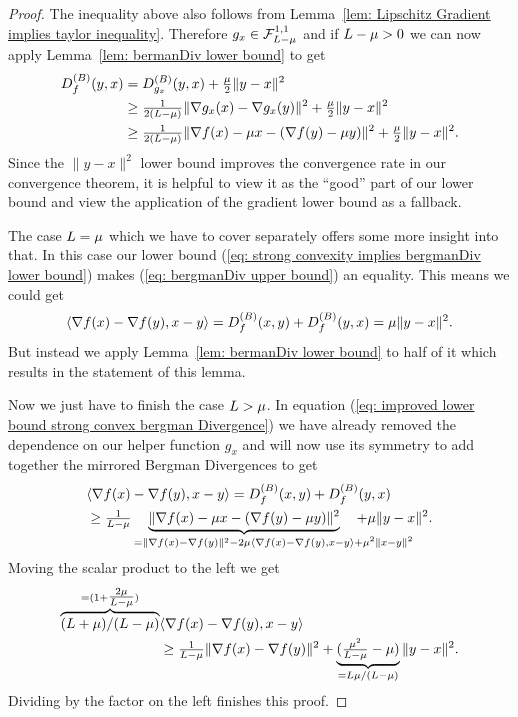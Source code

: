 \begin{proof}
	The inequality above also follows from Lemma~\ref{lem: Lipschitz Gradient
	implies taylor inequality}. Therefore
	\(g_x\in\mathcal{F}^{1,1}_{L-\mu}\) and if \(L -\mu>0\) we
	can now apply Lemma~\ref{lem: bermanDiv lower bound} to get
	\begin{align}
		D^{(B)}_{f}(y,x)
		&= D^{(B)}_{g_x}(y,x) + \tfrac{\mu}2 \|y-x\|^2
		\nonumber \\
		&\ge \tfrac{1}{2(L-\mu)} \|\nabla g_x(x) - \nabla g_x(y)\|^2
		+ \tfrac{\mu}2 \|y-x\|^2 
		\nonumber \\
		\label{eq: improved lower bound strong convex bergman Divergence}
		&\ge \tfrac{1}{2(L-\mu)}
		\|\nabla f(x) - \mu x - (\nabla f(y)-\mu y)\|^2
		+ \tfrac{\mu}2 \|y-x\|^2.
	\end{align}
	Since the \(\|y-x\|^2\) lower bound improves the convergence rate in
	our convergence theorem, it is helpful to view it as the ``good'' part of
	our lower bound and view the application of the gradient lower bound as
	a fallback.

	The case \(L=\mu\) which we have to cover separately offers some
	more insight into that. In this case our lower bound  (\ref{eq:
	strong convexity implies bergmanDiv lower bound}) makes (\ref{eq: bergmanDiv
	upper bound}) an equality. This means we could get
	\begin{align*}
		\langle \nabla f(x) - \nabla f(y), x-y\rangle
		= D^{(B)}_{f}(x,y) + D^{(B)}_{f}(y,x) = \mu \|y-x\|^2.
	\end{align*}
	But instead we apply Lemma~\ref{lem: bermanDiv lower bound} to half of it
	which results in the statement of this lemma.

	Now we just have to finish the case \(L>\mu\). In equation
	(\ref{eq: improved lower bound strong convex bergman Divergence}) we have
	already removed the dependence on our helper function \(g_x\) and will now
	use its symmetry to add together the mirrored Bergman Divergences to get
	\begin{align*}
		&\langle \nabla f(x) - \nabla f(y), x-y\rangle
		= \bergmanDiv{f}(x,y) + \bergmanDiv{f}(y,x) \\
		&\ge \tfrac{1}{\ubound-\lbound}
		\underbrace{\|\nabla f(x) - \lbound x - (\nabla f(y)-\lbound y)\|^2}_{
			=\|\nabla f(x) - \nabla f(y)\|^2
			- 2\lbound \langle \nabla f(x) - \nabla f(y), x-y\rangle
			\mathrlap{+ \lbound^2 \| x-y\|^2}
		}
		+ \lbound \|y-x\|^2.
	\end{align*}
	Moving the scalar product to the left we get
	\begin{align*}
		\overbrace{(L+\mu)/(L-\mu)}^{
			= (1+\tfrac{2\mu}{L-\mu})
		}
		&\langle \nabla f(x) - \nabla f(y), x-y\rangle \\
		&\ge \tfrac{1}{L-\mu}\|\nabla f(x) - \nabla f(y)\|^2
		+ \underbrace{(\tfrac{\mu^2}{L-\mu}-\mu)}_{
			=L\mu/(L-\mu)
		} \|y-x\|^2.
	\end{align*}
	Dividing by the factor on the left finishes this proof.
 \end{proof}

